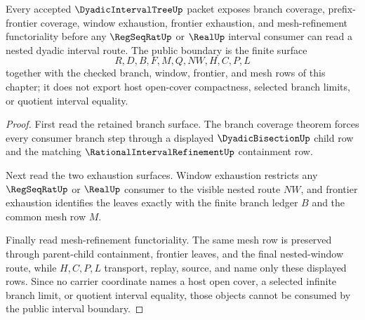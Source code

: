 \begin{theorem}
\label{thm:dyadic-interval-tree-public-boundary}
Every accepted $\DyadicIntervalTreeUp$ packet exposes branch coverage, prefix-frontier coverage, window exhaustion, frontier exhaustion, and mesh-refinement functoriality before any $\RegSeqRatUp$ or $\RealUp$ interval consumer can read a nested dyadic interval route. The public boundary is the finite surface
$$
R,D,B,F,M,Q,NW,H,C,P,L
$$
together with the checked branch, window, frontier, and mesh rows of this chapter; it does not export host open-cover compactness, selected branch limits, or quotient interval equality.
\end{theorem}
\begin{proof}
First read the retained branch surface. The branch coverage theorem forces every consumer branch step through a displayed $\DyadicBisectionUp$ child row and the matching $\RationalIntervalRefinementUp$ containment row.

Next read the two exhaustion surfaces. Window exhaustion restricts any $\RegSeqRatUp$ or $\RealUp$ consumer to the visible nested route $NW$, and frontier exhaustion identifies the leaves exactly with the finite branch ledger $B$ and the common mesh row $M$.

Finally read mesh-refinement functoriality. The same mesh row is preserved through parent-child containment, frontier leaves, and the final nested-window route, while $H,C,P,L$ transport, replay, source, and name only these displayed rows. Since no carrier coordinate names a host open cover, a selected infinite branch limit, or quotient interval equality, those objects cannot be consumed by the public interval boundary.
\end{proof}

